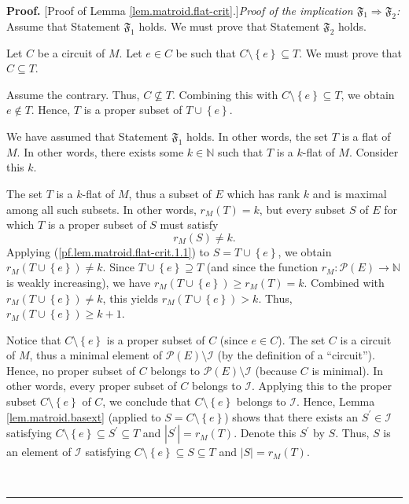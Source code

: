 \documentclass[numbers=enddot,12pt,final,onecolumn,notitlepage]{scrartcl}%
\theoremstyle{definition}
\newenvironment{proof}[1][Proof]{\noindent\textbf{#1.} }{\ \rule{0.5em}{0.5em}}
\begin{document}
\begin{proof}
[Proof of Lemma \ref{lem.matroid.flat-crit}.]\textit{Proof of the implication
$\mathfrak{F}$}$_{1}\Longrightarrow\mathfrak{F}_{2}$\textit{:} Assume that
Statement $\mathfrak{F}_{1}$ holds. We must prove that Statement
$\mathfrak{F}_{2}$ holds.

Let $C$ be a circuit of $M$. Let $e\in C$ be such that $C\setminus\left\{
e\right\}  \subseteq T$. We must prove that $C\subseteq T$.

Assume the contrary. Thus, $C\not \subseteq T$. Combining this with
$C\setminus\left\{  e\right\}  \subseteq T$, we obtain $e\notin T$. Hence, $T$
is a proper subset of $T\cup\left\{  e\right\}  $.

We have assumed that Statement $\mathfrak{F}_{1}$ holds. In other words, the
set $T$ is a flat of $M$. In other words, there exists some $k\in\mathbb{N}$
such that $T$ is a $k$-flat of $M$. Consider this $k$.

The set $T$ is a $k$-flat of $M$, thus a subset of $E$ which has rank $k$ and
is maximal among all such subsets. In other words, $r_{M}\left(  T\right)
=k$, but every subset $S$ of $E$ for which $T$ is a proper subset of $S$ must
satisfy%
\begin{equation}
r_{M}\left(  S\right)  \neq k. \label{pf.lem.matroid.flat-crit.1.1}%
\end{equation}
Applying (\ref{pf.lem.matroid.flat-crit.1.1}) to $S=T\cup\left\{  e\right\}
$, we obtain $r_{M}\left(  T\cup\left\{  e\right\}  \right)  \neq k$. Since
$T\cup\left\{  e\right\}  \supseteq T$ (and since the function $r_{M}%
:\mathcal{P}\left(  E\right)  \rightarrow\mathbb{N}$ is weakly increasing), we
have $r_{M}\left(  T\cup\left\{  e\right\}  \right)  \geq r_{M}\left(
T\right)  =k$. Combined with $r_{M}\left(  T\cup\left\{  e\right\}  \right)
\neq k$, this yields $r_{M}\left(  T\cup\left\{  e\right\}  \right)  >k$.
Thus, $r_{M}\left(  T\cup\left\{  e\right\}  \right)  \geq k+1$.

Notice that $C\setminus\left\{  e\right\}  $ is a proper subset of $C$ (since
$e\in C$). The set $C$ is a circuit of $M$, thus a minimal element of
$\mathcal{P}\left(  E\right)  \setminus\mathcal{I}$ (by the definition of a
\textquotedblleft circuit\textquotedblright). Hence, no proper subset of $C$
belongs to $\mathcal{P}\left(  E\right)  \setminus\mathcal{I}$ (because $C$ is
minimal). In other words, every proper subset of $C$ belongs to $\mathcal{I}$.
Applying this to the proper subset $C\setminus\left\{  e\right\}  $ of $C$, we
conclude that $C\setminus\left\{  e\right\}  $ belongs to $\mathcal{I}$.
Hence, Lemma \ref{lem.matroid.basext} (applied to $S=C\setminus\left\{
e\right\}  $) shows that there exists an $S^{\prime}\in\mathcal{I}$ satisfying
$C\setminus\left\{  e\right\}  \subseteq S^{\prime}\subseteq T$ and
$\left\vert S^{\prime}\right\vert =r_{M}\left(  T\right)  $. Denote this
$S^{\prime}$ by $S$. Thus, $S$ is an element of $\mathcal{I}$ satisfying
$C\setminus\left\{  e\right\}  \subseteq S\subseteq T$ and $\left\vert
S\right\vert =r_{M}\left(  T\right)  $.


\end{proof}
\end{document}
